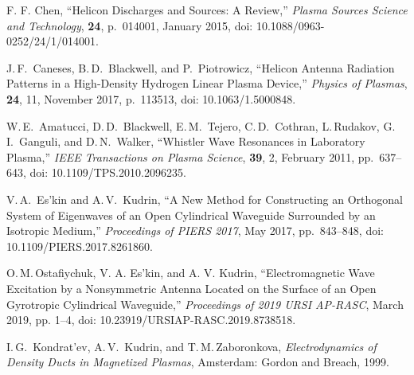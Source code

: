 \documentclass[summary]{URSIGASS2020}
\begin{document}
\begin{thebibliography}{99}
 F. F. Chen, ``Helicon Discharges and Sources: A Review,'' \emph{Plasma Sources Science and Technology}, \textbf{24}, p.~014001, January 2015, doi: 10.1088/0963-0252/24/1/014001.

 J.\,F.~Caneses, B.\,D.~Blackwell, and P.~Piotrowicz, ``Helicon Antenna Radiation Patterns in a High-Density Hydrogen Linear Plasma Device,'' \emph{Physics of Plasmas}, \textbf{24}, 11, November 2017, p.~113513, doi: 10.1063/1.5000848.

W.\,E.~Amatucci, D.\,D.~Blackwell, E.\,M.~Tejero, C.\,D.~Cothran, L.\,Rudakov, G.\,I.~Ganguli, and D.\,N.~Walker, ``Whistler Wave Resonances in Laboratory Plasma,'' \emph{IEEE Transactions on Plasma Science}, \textbf{39}, 2, February 2011, pp.~637--643, doi: 10.1109/TPS.2010.2096235.

 V.\,A.~Es'kin and A.\,V.~Kudrin, ``A New Method for Con\-structing an Orthogonal System of Eigenwaves of an Open Cylindrical Waveguide Surrounded by an Isotropic Medium,'' \emph{Proceedings of PIERS 2017}, May 2017, pp.~843--848, doi: 10.1109/PIERS.2017.8261860.

 O.\,M.\,Ostafiychuk, V. A. Es'kin, and A. V. Kudrin, ``Electromagnetic Wave Excitation by a Nonsymmetric Antenna Located on the Surface of an Open Gyrotropic Cylindrical Waveguide,'' \emph{Proceedings of 2019 URSI AP-RASC}, March 2019, pp. 1--4, doi:  10.23919/URSIAP-RASC.2019.8738518.
	
 I.\,G.~Kondrat'ev, A.\,V.~Kudrin, and T.\,M.\,Za\-bo\-ron\-ko\-va,
\emph{Electrodynamics of Density Ducts in Magnetized Plasmas}, Amsterdam: Gordon and
Breach, 1999.
	
\end{thebibliography}
\end{document}
